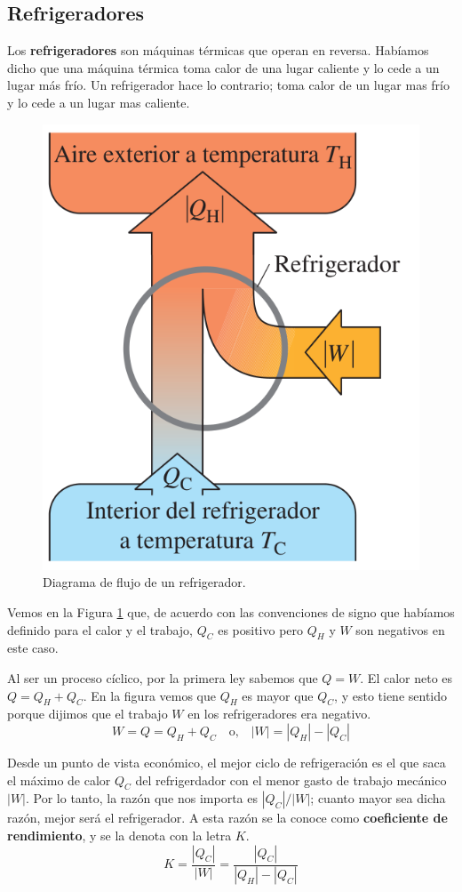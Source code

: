 \documentclass[12pt]{article}
\begin{document}
  \subsection{Refrigeradores}
  Los \textbf{refrigeradores} son máquinas térmicas que operan en reversa. Habíamos dicho que una máquina térmica toma calor de una lugar caliente y lo cede a un lugar más frío. Un refrigerador hace lo contrario; toma calor de un lugar mas frío y lo cede a un lugar mas caliente.

  \begin{figure}[H]
    \centering
    \includegraphics[width=0.4\linewidth]{imagenes/diag-flujo-refri.png}
    \caption{Diagrama de flujo de un refrigerador.}
    \label{fig:diag-flujo-refri}
  \end{figure}
  
  Vemos en la Figura \ref{fig:diag-flujo-refri} que, de acuerdo con las convenciones de signo que habíamos definido para el calor y el trabajo, $ Q_{C} $ es positivo pero $ Q_{H} $ y $ W $ son negativos en este caso.

  Al ser un proceso cíclico, por la primera ley sabemos que $ Q = W $. El calor neto es $ Q = Q_{H} + Q_{C} $. En la figura vemos que $ Q_{H} $ es mayor que $ Q_{C} $, y esto tiene sentido porque dijimos que el trabajo $ W $ en los refrigeradores era negativo.
  \[
  W = Q = Q_{H} + Q_{C} \quad  \text{o,} \quad \left|W\right| = \left|Q_{H}\right| - \left|Q_{C}\right| 
  \]

  Desde un punto de vista económico, el mejor ciclo de refrigeración es el que saca el máximo de calor $ Q_{C} $ del refrigerdador con el menor gasto de trabajo mecánico $ \left|W\right| $. Por lo tanto, la razón que nos importa es $ \left|Q_{C}\right|/\left|W\right| $; cuanto mayor sea dicha razón, mejor será el refrigerador. A esta razón se la conoce como \textbf{coeficiente de rendimiento}, y se la denota con la letra $ K $.
  \[
  K = \frac{\left|Q_{C}\right|}{\left|W\right|} = \frac{\left|Q_{C}\right|}{\left|Q_{H}\right| - \left|Q_{C}\right|}
  \]
\end{document}
